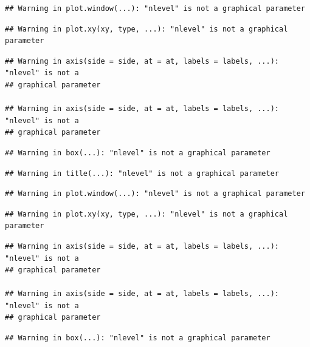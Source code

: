 \documentclass[
]{article}
\newenvironment{Shaded}{\begin{snugshade}}{\end{snugshade}}
\newcommand{\DecValTok}[1]{\textcolor[rgb]{0.00,0.00,0.81}{#1}}
\newcommand{\KeywordTok}[1]{\textcolor[rgb]{0.13,0.29,0.53}{\textbf{#1}}}
\newcommand{\NormalTok}[1]{#1}
\newcommand{\OperatorTok}[1]{\textcolor[rgb]{0.81,0.36,0.00}{\textbf{#1}}}
\newcommand{\StringTok}[1]{\textcolor[rgb]{0.31,0.60,0.02}{#1}}
\begin{document}
\begin{verbatim}
## Warning in plot.window(...): "nlevel" is not a graphical parameter
\end{verbatim}

\begin{verbatim}
## Warning in plot.xy(xy, type, ...): "nlevel" is not a graphical parameter
\end{verbatim}

\begin{verbatim}
## Warning in axis(side = side, at = at, labels = labels, ...): "nlevel" is not a
## graphical parameter

## Warning in axis(side = side, at = at, labels = labels, ...): "nlevel" is not a
## graphical parameter
\end{verbatim}

\begin{verbatim}
## Warning in box(...): "nlevel" is not a graphical parameter
\end{verbatim}

\begin{verbatim}
## Warning in title(...): "nlevel" is not a graphical parameter
\end{verbatim}

\begin{Shaded}
\end{Shaded}

\begin{verbatim}
## Warning in plot.window(...): "nlevel" is not a graphical parameter
\end{verbatim}

\begin{verbatim}
## Warning in plot.xy(xy, type, ...): "nlevel" is not a graphical parameter
\end{verbatim}

\begin{verbatim}
## Warning in axis(side = side, at = at, labels = labels, ...): "nlevel" is not a
## graphical parameter

## Warning in axis(side = side, at = at, labels = labels, ...): "nlevel" is not a
## graphical parameter
\end{verbatim}

\begin{verbatim}
## Warning in box(...): "nlevel" is not a graphical parameter
\end{verbatim}
\end{document}
